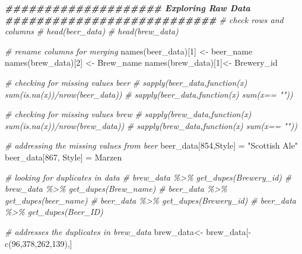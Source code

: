 \documentclass[
]{article}
\newenvironment{Shaded}{\begin{snugshade}}{\end{snugshade}}
\newcommand{\CommentTok}[1]{\textcolor[rgb]{0.56,0.35,0.01}{\textit{#1}}}
\newcommand{\DecValTok}[1]{\textcolor[rgb]{0.00,0.00,0.81}{#1}}
\newcommand{\DocumentationTok}[1]{\textcolor[rgb]{0.56,0.35,0.01}{\textbf{\textit{#1}}}}
\newcommand{\FunctionTok}[1]{\textcolor[rgb]{0.00,0.00,0.00}{#1}}
\newcommand{\NormalTok}[1]{#1}
\newcommand{\OtherTok}[1]{\textcolor[rgb]{0.56,0.35,0.01}{#1}}
\newcommand{\SpecialCharTok}[1]{\textcolor[rgb]{0.00,0.00,0.00}{#1}}
\newcommand{\StringTok}[1]{\textcolor[rgb]{0.31,0.60,0.02}{#1}}
\begin{document}
\begin{Shaded}
\begin{Highlighting}[]
\DocumentationTok{\#\#\#\#\#\#\#\#\#\#\#\#\#\#\#\#\#\#\#\# Exploring Raw Data \#\#\#\#\#\#\#\#\#\#\#\#\#\#\#\#\#\#\#\#\#\#\#\#\#\#\#}
\CommentTok{\# check rows and columns}
\CommentTok{\# head(beer\_data)}
\CommentTok{\# head(brew\_data)}

\CommentTok{\# rename columns for merging }
\FunctionTok{names}\NormalTok{(beer\_data)[}\DecValTok{1}\NormalTok{] }\OtherTok{\textless{}{-}} \StringTok{\textquotesingle{}beer\_name\textquotesingle{}}
\FunctionTok{names}\NormalTok{(brew\_data)[}\DecValTok{2}\NormalTok{] }\OtherTok{\textless{}{-}} \StringTok{\textquotesingle{}Brew\_name\textquotesingle{}}
\FunctionTok{names}\NormalTok{(brew\_data)[}\DecValTok{1}\NormalTok{]}\OtherTok{\textless{}{-}} \StringTok{\textquotesingle{}Brewery\_id\textquotesingle{}}


\CommentTok{\# checking for missing values beer }
\CommentTok{\# sapply(beer\_data,function(x) sum(is.na(x))/nrow(beer\_data))}
\CommentTok{\# sapply(beer\_data,function(x) sum(x== ""))}

\CommentTok{\# checking for missing values brew}
\CommentTok{\# sapply(brew\_data,function(x) sum(is.na(x))/nrow(brew\_data))}
\CommentTok{\# sapply(brew\_data,function(x) sum(x== ""))}

\CommentTok{\# addressing the missing values from beer}
\NormalTok{beer\_data[}\DecValTok{854}\NormalTok{,}\StringTok{\textquotesingle{}Style\textquotesingle{}}\NormalTok{] }\OtherTok{=} \StringTok{"Scottish Ale"}
\NormalTok{beer\_data[}\DecValTok{867}\NormalTok{, }\StringTok{\textquotesingle{}Style\textquotesingle{}}\NormalTok{] }\OtherTok{=} \StringTok{\textquotesingle{}Marzen\textquotesingle{}}



\CommentTok{\# looking for duplicates in data }
\CommentTok{\# brew\_data \%\textgreater{}\% get\_dupes(Brewery\_id)}
\CommentTok{\# brew\_data \%\textgreater{}\% get\_dupes(Brew\_name)}
\CommentTok{\# beer\_data \%\textgreater{}\% get\_dupes(beer\_name)}
\CommentTok{\# beer\_data \%\textgreater{}\% get\_dupes(Brewery\_id)}
\CommentTok{\# beer\_data \%\textgreater{}\% get\_dupes(Beer\_ID)}

\CommentTok{\# addresses the duplicates in brew\_data }
\NormalTok{brew\_data}\OtherTok{\textless{}{-}}\NormalTok{ brew\_data[}\SpecialCharTok{{-}}\FunctionTok{c}\NormalTok{(}\DecValTok{96}\NormalTok{,}\DecValTok{378}\NormalTok{,}\DecValTok{262}\NormalTok{,}\DecValTok{139}\NormalTok{),] }


\end{Highlighting}
\end{Shaded}
\end{document}

